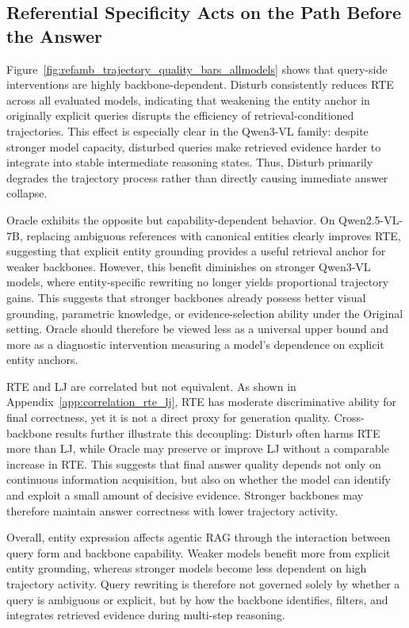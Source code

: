 \documentclass{article} %
\begin{document}
\subsection{Referential Specificity Acts on the Path Before the Answer}
Figure~\ref{fig:refamb_trajectory_quality_bars_allmodels} shows that query-side interventions are highly backbone-dependent. Disturb consistently reduces RTE across all evaluated models, indicating that weakening the entity anchor in originally explicit queries disrupts the efficiency of retrieval-conditioned trajectories. This effect is especially clear in the Qwen3-VL family: despite stronger model capacity, disturbed queries make retrieved evidence harder to integrate into stable intermediate reasoning states. Thus, Disturb primarily degrades the trajectory process rather than directly causing immediate answer collapse.

Oracle exhibits the opposite but capability-dependent behavior. On Qwen2.5-VL-7B, replacing ambiguous references with canonical entities clearly improves RTE, suggesting that explicit entity grounding provides a useful retrieval anchor for weaker backbones. However, this benefit diminishes on stronger Qwen3-VL models, where entity-specific rewriting no longer yields proportional trajectory gains. This suggests that stronger backbones already possess better visual grounding, parametric knowledge, or evidence-selection ability under the Original setting. Oracle should therefore be viewed less as a universal upper bound and more as a diagnostic intervention measuring a model's dependence on explicit entity anchors.

RTE and LJ are correlated but not equivalent. As shown in Appendix~\ref{app:correlation_rte_lj}, RTE has moderate discriminative ability for final correctness, yet it is not a direct proxy for generation quality. Cross-backbone results further illustrate this decoupling: Disturb often harms RTE more than LJ, while Oracle may preserve or improve LJ without a comparable increase in RTE. This suggests that final answer quality depends not only on continuous information acquisition, but also on whether the model can identify and exploit a small amount of decisive evidence. Stronger backbones may therefore maintain answer correctness with lower trajectory activity.

Overall, entity expression affects agentic RAG through the interaction between query form and backbone capability. Weaker models benefit more from explicit entity grounding, whereas stronger models become less dependent on high trajectory activity. Query rewriting is therefore not governed solely by whether a query is ambiguous or explicit, but by how the backbone identifies, filters, and integrates retrieved evidence during multi-step reasoning.
\end{document}
